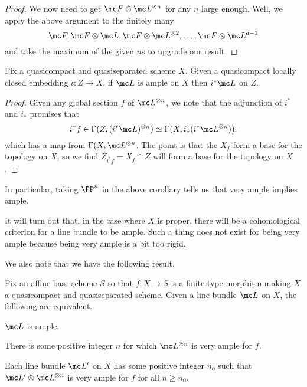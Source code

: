 \documentclass[../notes.tex]{subfiles}
\begin{document}
\begin{proof}
	We now need to get $\mc F\otimes\mc L^{\otimes n}$ for any $n$ large enough. Well, we apply the above argument to the finitely many
	\[\mc F,\mc F\otimes\mc L,\mc F\otimes\mc L^{\otimes2},\ldots,\mc F\otimes\mc L^{d-1}\]
	and take the maximum of the given $n$s to upgrade our result.
\end{proof}
\begin{corollary}
	Fix a quasicompact and quasiseparated scheme $X$. Given a quasicompact locally closed embedding $\iota\colon Z\to X$, if $\mc L$ is ample on $X$ then $i^*\mc L$ on $Z$.
\end{corollary}
\begin{proof}
	Given any global section $f$ of $\mc L^{\otimes n}$, we note that the adjunction of $i^*$ and $i_*$ promises that
	\[i^*f\in\Gamma(Z,(i^*\mc L)^{\otimes n})\simeq\Gamma(X,i_*(i^*\mc L^{\otimes n})),\]
	which has a map from $\Gamma(X,\mc L^{\otimes n}$. The point is that the $X_f$ form a base for the topology on $X$, so we find $Z_{i^*f}=X_f\cap Z$ will form a base for the topology on $X$.
\end{proof}
\begin{remark}
	In particular, taking $\PP^n$ in the above corollary tells us that very ample implies ample.
\end{remark}
\begin{remark}
	It will turn out that, in the case where $X$ is proper, there will be a cohomological criterion for a line bundle to be ample. Such a thing does not exist for being very ample because being very ample is a bit too rigid.
\end{remark}
We also note that we have the following result.
\begin{proposition}
	Fix an affine base scheme $S$ so that $f\colon X\to S$ is a finite-type morphism making $X$ a quasicompact and quasiseparated scheme. Given a line bundle $\mc L$ on $X$, the following are equivalent.
	\begin{listalph}
		\item $\mc L$ is ample.
		\item There is some positive integer $n$ for which $\mc L^{\otimes n}$ is very ample for $f$.
		\item Each line bundle $\mc L'$ on $X$ has some positive integer $n_0$ such that $\mc L'\otimes\mc L^{\otimes n}$ is very ample for $f$ for all $n\ge n_0$.
	\end{listalph}
\end{proposition}
\end{document}
